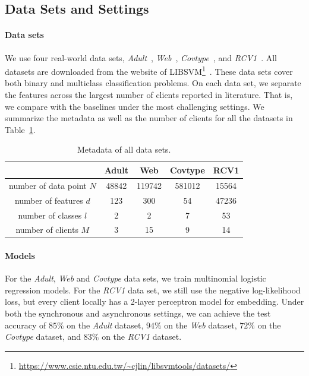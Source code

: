\subsection{Data Sets and Settings} \label{sec:8-8-1}

\paragraph{Data sets} We use four real-world data sets, \emph{Adult}~\cite{zeng2008fast}, \emph{Web}~\cite{platt1998fast}, \emph{Covtype}~\cite{blackard1999comparative}, and \emph{RCV1}~\cite{lewis2004rcv1}. All datasets are downloaded from the website of LIBSVM\footnote{\url{https://www.csie.ntu.edu.tw/~cjlin/libsvmtools/datasets/}}~\cite{libsvm}. These data sets cover both binary and multiclass classification problems. On each data set, we separate the features across the largest number of clients reported in literature. That is, we compare with the baselines under the most challenging settings. We summarize the metadata as well as the number of clients for all the datasets in Table~\ref{tab:metadata}.

\begin{table}[t]
    \centering
    \begin{tabular}{ccccc}
    \toprule
                                & Adult     & Web       & Covtype   & RCV1 \\ \midrule
     number of data point $N$   & 48842     & 119742    & 581012    & 15564   \\
     number of features $d$     & 123       & 300       & 54        & 47236\\
     number of classes $l$      & 2         & 2         & 7         & 53   \\
     number of clients $M$      & 3         & 15        & 9         &14   \\
    \bottomrule
    \end{tabular}
    \caption{Metadata of all data sets.}
    \label{tab:metadata}
\end{table}

\paragraph{Models} For the \emph{Adult}, \emph{Web} and \emph{Covtype} data sets, we train multinomial logistic regression models. For the \emph{RCV1} data set, we still use the negative log-likelihood loss, but every client locally has a 2-layer  perceptron model for embedding. Under both the synchronous and asynchronous settings, we can achieve the test accuracy of $85\%$ on the \emph{Adult} dataset, $94\%$ on the \emph{Web} dataset, $72\%$ on the \emph{Covtype} dataset, and $83\%$ on the \emph{RCV1} dataset. 

